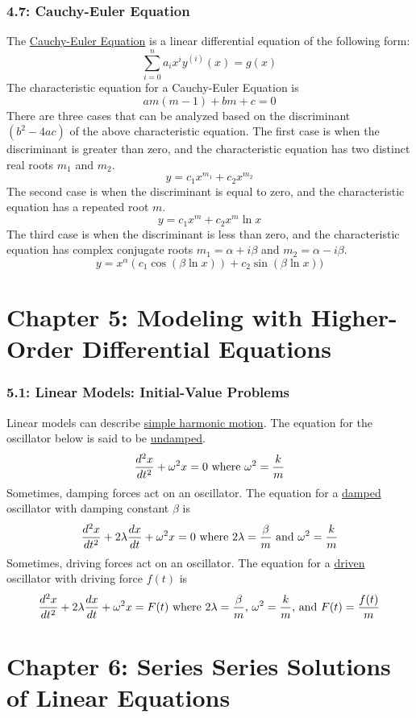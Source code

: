 \documentclass{article}
\begin{document}
\section*{4.7: Cauchy-Euler Equation}
The \underline{Cauchy-Euler Equation} is a linear differential equation of the following form:
\[\sum_{i=0}^na_ix^iy^{(i)}(x)=g(x)\]
The characteristic equation for a Cauchy-Euler Equation is
\[am(m-1)+bm+c=0\]
There are three cases that can be analyzed based on the discriminant \((b^2-4ac)\) of the above characteristic equation. The first case is when the discriminant is greater than zero, and the characteristic equation has two distinct real roots \(m_1\) and \(m_2\).
\[y=c_1x^{m_1}+c_2x^{m_2}\]
The second case is when the discriminant is equal to zero, and the characteristic equation has a repeated root \(m\).
\[y=c_1x^{m}+c_2x^{m}\ln x\]
The third case is when the discriminant is less than zero, and the characteristic equation has complex conjugate roots \(m_1=\alpha+i\beta\) and \(m_2=\alpha-i\beta\).
\[y=x^{\alpha}(c_1\cos(\beta\ln x))+c_2\sin(\beta\ln x))\]
\part*{Chapter 5: Modeling with Higher-Order Differential Equations}
\section*{5.1: Linear Models: Initial-Value Problems}
Linear models can describe \underline{simple harmonic motion}. The equation for the oscillator below is said to be \underline{undamped}.
\[\frac{d^2x}{dt^2}+\omega^2x=0\textnormal{ where }\omega^2=\frac{k}{m}\]
Sometimes, damping forces act on an oscillator. The equation for a \underline{damped} oscillator with damping constant \(\beta\) is
\[\frac{d^2x}{dt^2}+2\lambda\frac{dx}{dt}+\omega^2x=0\textnormal{ where }2\lambda=\frac{\beta}{m}\textnormal{ and }\omega^2=\frac{k}{m}\]
Sometimes, driving forces act on an oscillator. The equation for a \underline{driven} oscillator with driving force \(f(t)\) is
\[\frac{d^2x}{dt^2}+2\lambda\frac{dx}{dt}+\omega^2x=F(t)\textnormal{ where }2\lambda=\frac{\beta}{m}\textnormal{, }\omega^2=\frac{k}{m}\textnormal{, and }F(t)=\frac{f(t)}{m}\]
\part*{Chapter 6: Series Series Solutions of Linear Equations}
\end{document}
